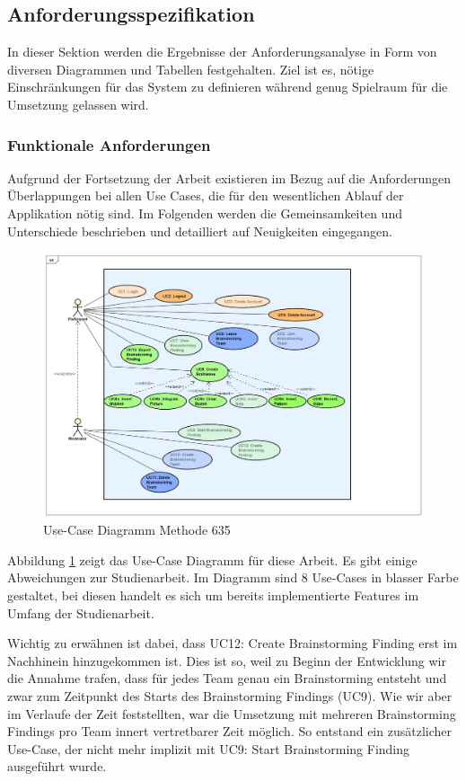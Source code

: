 \subsection{Anforderungsspezifikation}
In dieser Sektion werden die Ergebnisse der Anforderungsanalyse in Form von diversen Diagrammen und Tabellen festgehalten. Ziel ist es, nötige Einschränkungen für das System zu definieren während genug Spielraum für die Umsetzung gelassen wird. 

\subsubsection{Funktionale Anforderungen}\label{sec:functional-requirements}
Aufgrund der Fortsetzung der Arbeit existieren im Bezug auf die Anforderungen Überlappungen bei allen Use Cases, die für den wesentlichen Ablauf der Applikation nötig sind. Im Folgenden werden die Gemeinsamkeiten und Unterschiede beschrieben und detailliert auf Neuigkeiten eingegangen. 


\begin{figure}[h]
	\centering
	\includegraphics[width=1\linewidth]{./img/anforderungen/UC-Methode635.png}
	\caption{Use-Case Diagramm Methode 635}
	\label{fig:uc-methode635}
\end{figure}
Abbildung \ref{fig:uc-methode635} zeigt das Use-Case Diagramm für diese Arbeit. Es gibt einige Abweichungen zur Studienarbeit. Im Diagramm sind 8 Use-Cases in blasser Farbe gestaltet, bei diesen handelt es sich um bereits implementierte Features im Umfang der Studienarbeit. 

Wichtig zu erwähnen ist dabei, dass UC12: Create Brainstorming Finding erst im Nachhinein hinzugekommen ist. Dies ist so, weil zu Beginn der Entwicklung wir die Annahme trafen, dass für jedes Team genau ein Brainstorming entsteht und zwar zum Zeitpunkt des Starts des Brainstorming Findings (UC9). Wie wir aber im Verlaufe der Zeit feststellten, war die Umsetzung mit mehreren Brainstorming Findings pro Team innert vertretbarer Zeit möglich. So entstand ein zusätzlicher Use-Case, der nicht mehr implizit mit UC9: Start Brainstorming Finding ausgeführt wurde.

